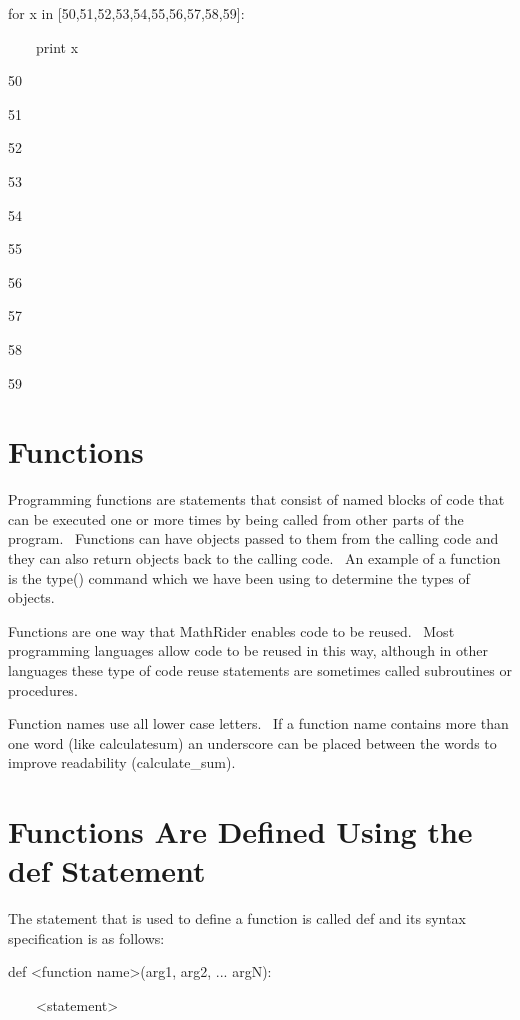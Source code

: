 \documentclass[12pt,twoside]{book}
\begin{document}
for x in [50,51,52,53,54,55,56,57,58,59]:

\ \ \ \ print x

{\textbar}

50

51

52

53

54

55

56

57

58

59

\section[Functions]{Functions}

Programming functions are statements that consist of named blocks of code that can be executed one or more times by being called from other parts of the program. \ Functions can have objects passed to them from the calling code and they can also return objects back to the calling code. \ An example of a function is the type() command which we have been using to determine the types of objects. 

\bigskip

Functions are one way that MathRider enables code to be reused. \ Most programming languages allow code to be reused in this way, although in other languages these type of code reuse statements are sometimes called subroutines or procedures. 

\bigskip

Function names use all lower case letters. \ If a function name contains more than one word (like calculatesum) an underscore can be placed between the words to improve readability (calculate\_sum).

\section[Functions Are Defined Using the def Statement]{Functions Are Defined Using the def Statement}

The statement that is used to define a function is called def and its syntax specification is as follows: 

\bigskip

def {\textless}function name{\textgreater}(arg1, arg2, ... argN):

\ \ \ \ {\textless}statement{\textgreater}
\end{document}
